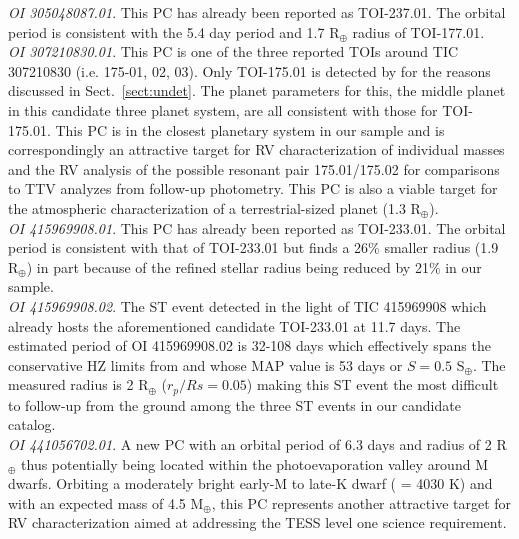 \emph{OI 305048087.01}. This PC has already been reported as TOI-237.01. The \pipeline{} orbital
period is consistent with the 5.4 day period and 1.7 R$_{\oplus}$ radius of TOI-177.01. \\

\emph{OI 307210830.01}. This PC is one of the three reported TOIs around TIC 307210830 (i.e. 175-01,
02, 03). Only TOI-175.01 is detected by \pipeline{} for the reasons discussed in Sect.~\ref{sect:undet}.
The \pipeline{} planet parameters for this, the middle planet in this candidate three planet
system, are all consistent with those for TOI-175.01. This PC is in the closest planetary system
in our sample and is correspondingly an attractive target for RV characterization of individual masses
and the RV analysis of the  possible resonant pair 175.01/175.02 for comparisons to TTV analyzes
from follow-up photometry. This PC is also a viable target for the atmospheric characterization of
a terrestrial-sized planet (1.3 R$_{\oplus}$). \\

\emph{OI 415969908.01}. This PC has already been reported as TOI-233.01. The \pipeline{} orbital
period is consistent with that of TOI-233.01 but finds a 26\% smaller radius (1.9 R$_{\oplus}$)
in part because of the refined stellar radius being reduced by 21\% in our sample. \\

\emph{OI 415969908.02}. The ST event detected in the light of TIC 415969908 which already
hosts the aforementioned candidate TOI-233.01 at 11.7 days. The estimated period of OI 415969908.02 is 32-108 days
which effectively spans the conservative HZ limits from \cite{kopparapu13} and whose MAP value is
53 days or $S=0.5$ S$_{\oplus}$. The measured radius is 2 R$_{\oplus}$ ($r_p/Rs=0.05$) making this
ST event the most difficult to follow-up from the ground among the three ST events in our candidate
catalog. \\

\emph{OI 441056702.01}. A new PC with an orbital period of 6.3 days and radius of 2 R$_{\oplus}$
thus potentially being located within the photoevaporation valley around M dwarfs. Orbiting a moderately bright
early-M to late-K dwarf (\teff{} = 4030 K) and with an expected mass of 4.5 M$_{\oplus}$, this PC
represents another attractive target for RV characterization aimed at addressing the TESS level
one science requirement. \\


